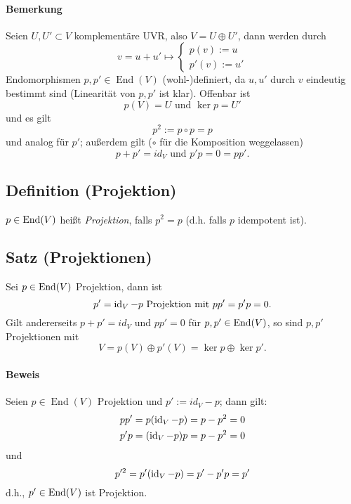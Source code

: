 \paragraph{Bemerkung}
	Seien $ U,U'\subset V $ komplementäre UVR, also $ V = U \oplus U' $, dann werden durch
		\begin{equation*}
		v = u+u' \mapsto
			\begin{cases}
				p(v):=u\\
				p'(v):= u'
			\end{cases}
		\end{equation*}
	Endomorphismen $ p,p'\in \operatorname{End}(V) $ (wohl-)definiert, da $ u,u' $ durch $ v $ eindeutig bestimmt sind (Linearität von $ p,p' $ ist klar).
	Offenbar ist 
		\[ p(V) = U \text{ und } \ker p = U'\]
	und es gilt
		\[ p^2 := p\circ p = p \]
	und analog für $ p' $; außerdem gilt ($ \circ $ für die Komposition weggelassen)
		\[ p+p' = id_V \text{ und } p'p = 0 = pp'.\]
		
\subsection{Definition (Projektion)}
	\begin{Definition}[Projektion]
		$ p\in \operatorname{End}(V) $ heißt \emph{Projektion}, falls $ p^2 = p $ (d.h. falls $ p $ idempotent ist).
	\end{Definition}
	
\subsection{Satz (Projektionen)}
	\begin{Satz}[Projektionen]
	Sei $ p\in \operatorname{End}(V) $ Projektion, dann ist
            \[ p'= \operatorname{id}_V-p \text{ Projektion mit }  pp' = p'p = 0.\]
        Gilt andererseits $ p+p' = id_V $ und $ pp' = 0 $ für $ p,p' \in \operatorname{End}(V) $, so sind $ p,p' $ Projektionen mit
		\[ V = p(V)\oplus p'(V) = \ker p \oplus \ker p'. \]
	\end{Satz}

\paragraph{Beweis}
	Seien $p\in \operatorname{End}(V)$ Projektion und $p' := id_V -p$; dann gilt:
		\begin{align*}
		pp' &= p(\operatorname{id}_V-p)=p-p^{2} = 0 \\
		p'p &= (\operatorname{id}_V-p)p = p - p^{2} = 0
		\end{align*}
	und
		\[p'^2 = p'(\operatorname{id}_V-p)=p'-p'p = p'\]
	d.h., $p'\in\operatorname{End}(V)$ ist Projektion.
	
